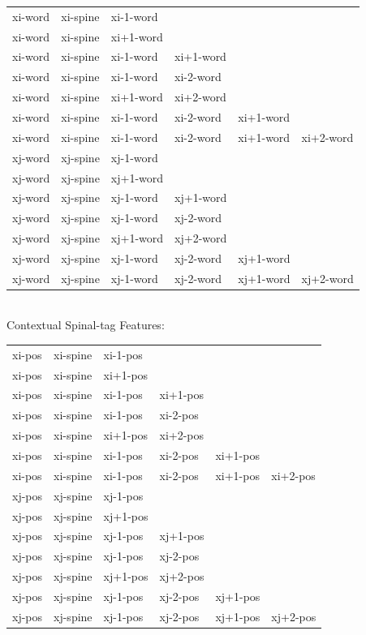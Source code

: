 \documentclass[11pt]{article}
\begin{document}
\begin{tabular}{|l l l l l l|}
	\hline
    	xi-word& xi-spine& xi-1-word&&&\\
        xi-word& xi-spine& xi+1-word&&&\\
    	xi-word& xi-spine& xi-1-word& xi+1-word&&\\
        xi-word& xi-spine& xi-1-word& xi-2-word&&\\
        xi-word& xi-spine& xi+1-word& xi+2-word&&\\
        xi-word& xi-spine& xi-1-word& xi-2-word&xi+1-word&\\
    	xi-word& xi-spine& xi-1-word& xi-2-word&xi+1-word&xi+2-word\\
    	xj-word& xj-spine& xj-1-word&&&\\
        xj-word& xj-spine& xj+1-word&&&\\
    	xj-word& xj-spine& xj-1-word& xj+1-word&&\\
        xj-word& xj-spine& xj-1-word& xj-2-word&&\\
        xj-word& xj-spine& xj+1-word& xj+2-word&&\\
        xj-word& xj-spine& xj-1-word& xj-2-word&xj+1-word&\\
    	xj-word& xj-spine& xj-1-word& xj-2-word&xj+1-word&xj+2-word\\
	\hline
\end{tabular} \\

Contextual Spinal-tag Features: \\

\begin{tabular}{|l l l l l l|}
	\hline
    	xi-pos& xi-spine& xi-1-pos&&&\\
        xi-pos& xi-spine& xi+1-pos&&&\\
    	xi-pos& xi-spine& xi-1-pos& xi+1-pos&&\\
        xi-pos& xi-spine& xi-1-pos& xi-2-pos&&\\
        xi-pos& xi-spine& xi+1-pos& xi+2-pos&&\\
        xi-pos& xi-spine& xi-1-pos& xi-2-pos&xi+1-pos&\\
    	xi-pos& xi-spine& xi-1-pos& xi-2-pos&xi+1-pos&xi+2-pos\\
    	xj-pos& xj-spine& xj-1-pos&&&\\
        xj-pos& xj-spine& xj+1-pos&&&\\
    	xj-pos& xj-spine& xj-1-pos& xj+1-pos&&\\
        xj-pos& xj-spine& xj-1-pos& xj-2-pos&&\\
        xj-pos& xj-spine& xj+1-pos& xj+2-pos&&\\
        xj-pos& xj-spine& xj-1-pos& xj-2-pos&xj+1-pos&\\
    	xj-pos& xj-spine& xj-1-pos& xj-2-pos&xj+1-pos&xj+2-pos\\
	\hline
\end{tabular} \\
\end{document}
